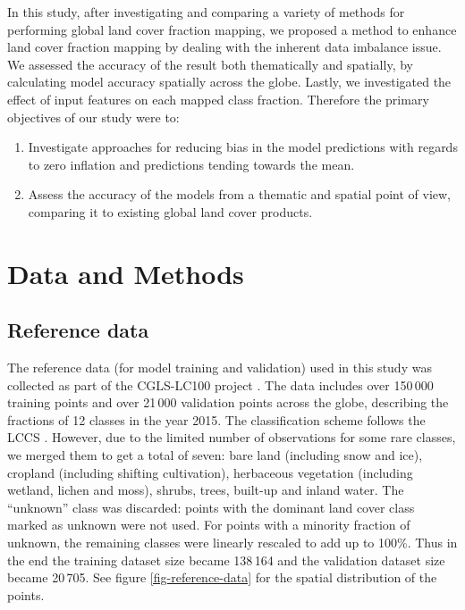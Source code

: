 \documentclass[review,authoryear,3p]{elsarticle}
\begin{document}

In this study, after investigating and comparing a variety of methods for performing global land cover fraction mapping, we proposed a method to enhance land cover fraction mapping by dealing with the inherent data imbalance issue.
We assessed the accuracy of the result both thematically and spatially, by calculating model accuracy spatially across the globe.
Lastly, we investigated the effect of input features on each mapped class fraction.
Therefore the primary objectives of our study were to:

\begin{enumerate}
 \item Investigate approaches for reducing bias in the model predictions with regards to zero inflation and predictions tending towards the mean.
 \item Assess the accuracy of the models from a thematic and spatial point of view, comparing it to existing global land cover products.
\end{enumerate}

\section{Data and Methods}

\subsection{Reference data}

The reference data (for model training and validation) used in this study was collected as part of the \ac{CGLS-LC100} project \citep{buchhorn_copernicus_2020, nandin-erdene_tsendbazar_copernicus_2019}.
The data includes over 150\,000 training points and over 21\,000 validation points across the globe, describing the fractions of 12 classes in the year 2015.
The classification scheme follows the \gls{LCCS} \citep{buchhorn_copernicus_2020}.
However, due to the limited number of observations for some rare classes, we merged them to get a total of seven: bare land (including snow and ice), cropland (including shifting cultivation), herbaceous vegetation (including wetland, lichen and moss), shrubs, trees, built-up and inland water.
The ``unknown'' class was discarded: points with the dominant land cover class marked as unknown were not used.
For points with a minority fraction of unknown, the remaining classes were linearly rescaled to add up to 100\%.
Thus in the end the training dataset size became 138\,164 and the validation dataset size became 20\,705. See figure \ref{fig-reference-data} for the spatial distribution of the points.
\end{document}

